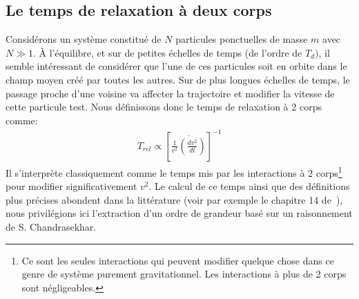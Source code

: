 



\subsection{Le temps de relaxation à deux corps}

Considérons un système constitué de $N$ particules ponctuelles de masse $m$ avec $N\gg1$. À l'équilibre, et sur de petites échelles de temps (de
l'ordre de $T_{d})$, il semble intéressant de considérer que l'une de ces particules soit en orbite dans le champ moyen créé par toutes les autres. Sur
de plus longues échelles de temps, le passage proche d'une voisine va affecter la trajectoire et modifier la vitesse de cette
particule test. Nous définissons donc le temps de relaxation à 2 corps comme:
\begin{align}
	T_{rel}\propto\left[  \overline{\frac{1}{v^{2}}\left(  \frac{dv^{2}}{dt}\right)  }\right]  ^{-1} \label{TREL}%
\end{align}
Il s'interprète classiquement comme le temps mis par les interactions à 2 corps\footnote{Ce sont les seules interactions qui peuvent modifier quelque
chose dans ce genre de système purement gravitationnel. Les interactions à plus de 2 corps sont négligeables.} pour modifier significativement
$v^{2}$. Le calcul de ce temps ainsi que des définitions plus précises abondent dans la littérature (voir par exemple le chapitre 14 de\ \cite{HH}),
nous privilégions ici l'extraction d'un ordre de grandeur basé sur un raisonnement de S. Chandrasekhar.

